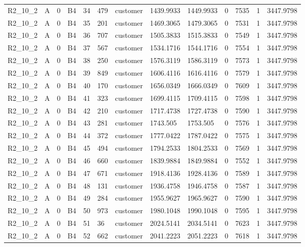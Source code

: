 \begin{longtable}{lllllllllllll}
R2\_10\_2 & A & 0 & B4 & 34 & 479 & customer & 1439.9933 & 1449.9933 & 0 & 7535 & 1 & 3447.9798 \\
R2\_10\_2 & A & 0 & B4 & 35 & 201 & customer & 1469.3065 & 1479.3065 & 0 & 7531 & 1 & 3447.9798 \\
R2\_10\_2 & A & 0 & B4 & 36 & 707 & customer & 1505.3833 & 1515.3833 & 0 & 7549 & 1 & 3447.9798 \\
R2\_10\_2 & A & 0 & B4 & 37 & 567 & customer & 1534.1716 & 1544.1716 & 0 & 7554 & 1 & 3447.9798 \\
R2\_10\_2 & A & 0 & B4 & 38 & 250 & customer & 1576.3119 & 1586.3119 & 0 & 7573 & 1 & 3447.9798 \\
R2\_10\_2 & A & 0 & B4 & 39 & 849 & customer & 1606.4116 & 1616.4116 & 0 & 7579 & 1 & 3447.9798 \\
R2\_10\_2 & A & 0 & B4 & 40 & 170 & customer & 1656.0349 & 1666.0349 & 0 & 7609 & 1 & 3447.9798 \\
R2\_10\_2 & A & 0 & B4 & 41 & 323 & customer & 1699.4115 & 1709.4115 & 0 & 7598 & 1 & 3447.9798 \\
R2\_10\_2 & A & 0 & B4 & 42 & 210 & customer & 1717.4738 & 1727.4738 & 0 & 7590 & 1 & 3447.9798 \\
R2\_10\_2 & A & 0 & B4 & 43 & 281 & customer & 1743.505 & 1753.505 & 0 & 7576 & 1 & 3447.9798 \\
R2\_10\_2 & A & 0 & B4 & 44 & 372 & customer & 1777.0422 & 1787.0422 & 0 & 7575 & 1 & 3447.9798 \\
R2\_10\_2 & A & 0 & B4 & 45 & 494 & customer & 1794.2533 & 1804.2533 & 0 & 7569 & 1 & 3447.9798 \\
R2\_10\_2 & A & 0 & B4 & 46 & 660 & customer & 1839.9884 & 1849.9884 & 0 & 7552 & 1 & 3447.9798 \\
R2\_10\_2 & A & 0 & B4 & 47 & 671 & customer & 1918.4136 & 1928.4136 & 0 & 7589 & 1 & 3447.9798 \\
R2\_10\_2 & A & 0 & B4 & 48 & 131 & customer & 1936.4758 & 1946.4758 & 0 & 7587 & 1 & 3447.9798 \\
R2\_10\_2 & A & 0 & B4 & 49 & 284 & customer & 1955.9627 & 1965.9627 & 0 & 7590 & 1 & 3447.9798 \\
R2\_10\_2 & A & 0 & B4 & 50 & 973 & customer & 1980.1048 & 1990.1048 & 0 & 7595 & 1 & 3447.9798 \\
R2\_10\_2 & A & 0 & B4 & 51 & 36 & customer & 2024.5141 & 2034.5141 & 0 & 7623 & 1 & 3447.9798 \\
R2\_10\_2 & A & 0 & B4 & 52 & 662 & customer & 2041.2223 & 2051.2223 & 0 & 7618 & 1 & 3447.9798 \\

\end{longtable}
